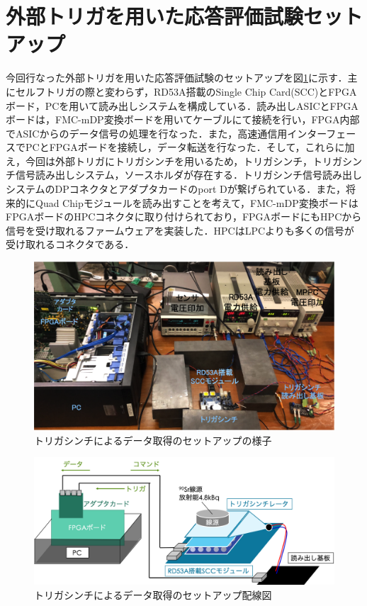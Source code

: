\section{外部トリガを用いた応答評価試験セットアップ}
\label{sec:extsetup}
今回行なった外部トリガを用いた応答評価試験のセットアップを図\ref{fig:extsetup}に示す．主にセルフトリガの際と変わらず，RD53A搭載のSingle Chip Card(SCC)とFPGAボード，PCを用いて読み出しシステムを構成している．読み出しASICとFPGAボードは，FMC-mDP変換ボードを用いてケーブルにて接続を行い，FPGA内部でASICからのデータ信号の処理を行なった．また，高速通信用インターフェースでPCとFPGAボードを接続し，データ転送を行なった．そして，これらに加え，今回は外部トリガにトリガシンチを用いるため，トリガシンチ，トリガシンチ信号読み出しシステム，ソースホルダが存在する．トリガシンチ信号読み出しシステムのDPコネクタとアダプタカードのport Dが繋げられている．また，将来的にQuad Chipモジュールを読み出すことを考えて，FMC-mDP変換ボードはFPGAボードのHPCコネクタに取り付けられており，FPGAボードにもHPCから信号を受け取れるファームウェアを実装した．HPCはLPCよりも多くの信号が受け取れるコネクタである．\par

\begin{figure}[h]
  \centering
  \includegraphics[width=15cm]{./figure/extsetup.png}
  \caption{トリガシンチによるデータ取得のセットアップの様子}
  \label{fig:extsetup}
\end{figure}

\begin{figure}[h]
  \centering
  \includegraphics[width=15cm]{./figure/extsetupcab.png}
  \caption{トリガシンチによるデータ取得のセットアップ配線図}
  \label{fig:extsetupcab}
\end{figure}

